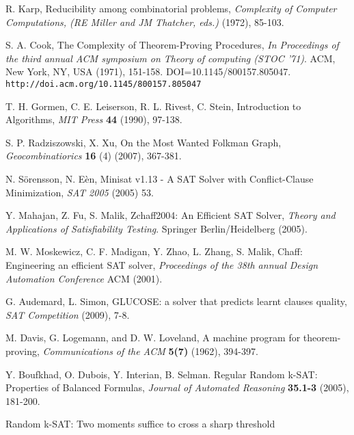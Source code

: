 \documentclass[paper=a4, fontsize=11pt]{scrartcl} %
\begin{document}
\begin{thebibliography}{9}

 R. Karp, Reducibility among combinatorial problems, \emph{Complexity of Computer Computations, (RE Miller and JM Thatcher, eds.)} (1972), 85-103.

 S. A. Cook, The Complexity of Theorem-Proving Procedures, \emph{In Proceedings of the third annual ACM symposium on Theory of computing (STOC '71)}. ACM, New York, NY, USA (1971), 151-158. DOI=10.1145/800157.805047. {\tt http://doi.acm.org/10.1145/800157.805047}

 T. H. Gormen, C. E. Leiserson, R. L. Rivest, C. Stein, Introduction to Algorithms, \emph{MIT Press} \textbf{44} (1990), 97-138.

 S. P. Radziszowski, X. Xu, On the Most Wanted Folkman Graph, \emph{Geocombinatiorics} \textbf{16} (4) (2007), 367-381.

 N. S\"{o}rensson, N. E\`{e}n, Minisat v1.13 - A SAT Solver with Conflict-Clause Minimization, \emph{SAT 2005} (2005) 53.

 Y. Mahajan, Z. Fu, S. Malik, Zchaff2004: An Efficient SAT Solver, \emph{Theory and Applications of Satisfiability Testing}. Springer Berlin/Heidelberg (2005).

 M. W. Moskewicz, C. F. Madigan, Y. Zhao, L. Zhang, S. Malik, Chaff: Engineering an efficient SAT solver, \emph{Proceedings of the 38th annual Design Automation Conference} ACM (2001).

 G. Audemard, L. Simon, GLUCOSE: a solver that predicts learnt clauses quality, \emph{SAT Competition} (2009), 7-8.

 M. Davis, G. Logemann, and D. W. Loveland, A machine program for theorem-proving, \emph{Communications of the ACM} \textbf{5(7)} (1962), 394-397.

 Y. Boufkhad, O. Dubois, Y. Interian, B. Selman. Regular Random k-SAT: Properties of Balanced Formulas, \emph{Journal of Automated Reasoning} \textbf{35.1-3} (2005), 181-200.

 Random k-SAT: Two moments suffice to cross a sharp threshold

\end{thebibliography}
\end{document}
